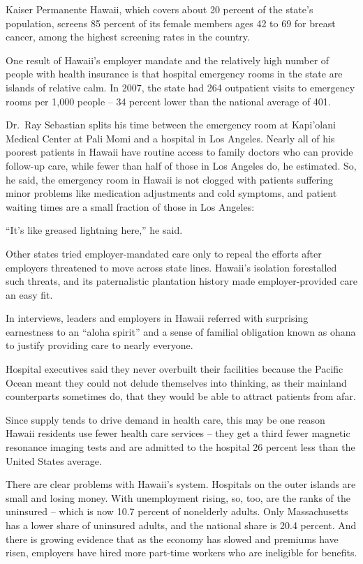 ﻿\documentclass[12pt]{article}
\begin{document}
Kaiser Permanente Hawaii, which covers about 20 percent of the state's population, screens 85
percent of its female members ages 42 to 69 for breast cancer, among the highest screening rates in
the country.

One result of Hawaii's employer mandate and the relatively high number of people with health
insurance is that hospital emergency rooms in the state are islands of relative calm. In 2007, the
state had 264 outpatient visits to emergency rooms per 1,000 people -- 34 percent lower than the
national average of 401.

Dr.~Ray Sebastian splits his time between the emergency room at Kapi'olani Medical Center at Pali
Momi and a hospital in Los Angeles. Nearly all of his poorest patients in Hawaii have routine access
to family doctors who can provide follow-up care, while fewer than half of those in Los Angeles do,
he estimated. So, he said, the emergency room in Hawaii is not clogged with patients suffering minor
problems like medication adjustments and cold symptoms, and patient waiting times are a small
fraction of those in Los Angeles:

``It's like greased lightning here,'' he said.

Other states tried employer-mandated care only to repeal the efforts after employers threatened to
move across state lines. Hawaii's isolation forestalled such threats, and its
paternalistic\cite{paternalistic} plantation history made employer-provided care an easy fit.

In interviews, leaders and employers in Hawaii referred with surprising earnestness to an ``aloha
spirit'' and a sense of familial obligation known as ohana to justify providing care to nearly
everyone.

Hospital executives said they never overbuilt their facilities because the Pacific Ocean meant they
could not delude\cite{delude} themselves into thinking, as their mainland counterparts sometimes do,
that they would be able to attract patients from afar.

Since supply tends to drive demand in health care, this may be one reason Hawaii residents use fewer
health care services -- they get a third fewer magnetic resonance imaging tests and are admitted to
the hospital 26 percent less than the United States average.

There are clear problems with Hawaii's system. Hospitals on the outer islands are small and losing
money. With unemployment rising, so, too, are the ranks of the uninsured -- which is now 10.7
percent of nonelderly adults. Only Massachusetts has a lower share of uninsured adults, and the
national share is 20.4 percent. And there is growing evidence that as the economy has slowed and
premiums have risen, employers have hired more part-time workers who are ineligible for benefits.
\end{document}
